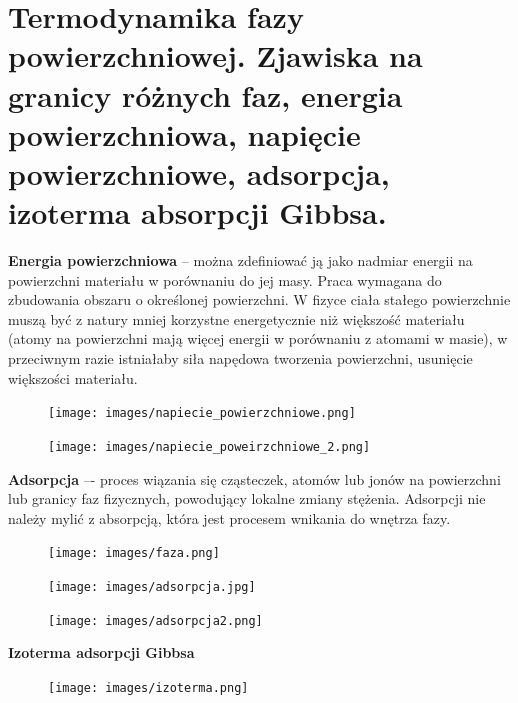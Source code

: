 \documentclass{article}
\begin{document}
\section{Termodynamika fazy powierzchniowej. Zjawiska na granicy różnych faz, energia powierzchniowa, napięcie powierzchniowe, adsorpcja, izoterma absorpcji Gibbsa.}

\textbf{Energia powierzchniowa} -- można zdefiniować ją jako nadmiar energii na powierzchni materiału w porównaniu do jej masy. Praca wymagana do zbudowania obszaru o określonej powierzchni. W fizyce ciała stałego powierzchnie muszą być z natury mniej korzystne energetycznie niż większość materiału (atomy na powierzchni mają więcej energii w porównaniu z atomami w masie), w przeciwnym razie istniałaby siła napędowa tworzenia powierzchni, usunięcie większości materiału.

\begin{figure}[H]
    \centering
    \texttt{[image: images/napiecie\_powierzchniowe.png]}
\end{figure}

\begin{figure}[H]
    \centering
    \texttt{[image: images/napiecie\_poweirzchniowe\_2.png]}
\end{figure}

\textbf{Adsorpcja} –- proces wiązania się cząsteczek, atomów lub jonów na powierzchni lub granicy faz fizycznych, powodujący lokalne zmiany stężenia. Adsorpcji nie należy mylić z absorpcją, która jest procesem wnikania do wnętrza fazy.

\begin{figure}[H]
    \centering
    \texttt{[image: images/faza.png]}
\end{figure}

\begin{figure}[H]
    \centering
    \texttt{[image: images/adsorpcja.jpg]}
\end{figure}

\begin{figure}[H]
    \centering
    \texttt{[image: images/adsorpcja2.png]}
\end{figure}

\begin{center}
    \textbf{Izoterma adsorpcji Gibbsa}
\end{center}
\vspace{-0.5cm}
\begin{figure}[H]
    \centering
    \texttt{[image: images/izoterma.png]}
\end{figure}
\end{document}

